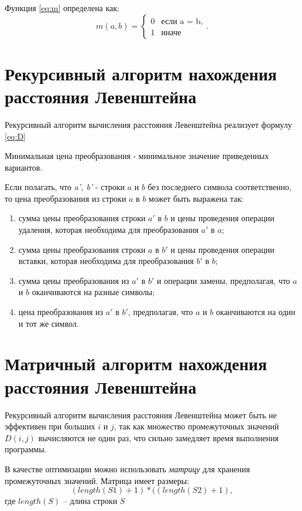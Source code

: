 Функция \ref{eq:m} определена как:
\begin{equation}
	\label{eq:m}
	m(a, b) = \begin{cases}
		0 &\text{если a = b,}\\
		1 &\text{иначе}
	\end{cases}.
\end{equation}


\section{Рекурсивный алгоритм нахождения расстояния Левенштейна}
Рекурсивный алгоритм вычисления расстояния Левенштейна реализует формулу \ref{eq:D}

Минимальная цена преобразования - минимальное значение приведенных вариантов.

Если полагать, что \textit{a', b'} - строки $a$ и $b$ без последнего символа соответственно, то цена преобразования из строки $a$ в $b$ может быть выражена так:

\begin{enumerate}
	\item сумма цены преобразования строки $a'$ в $b$ и цены проведения операции удаления, которая необходима для преобразования $a'$ в $a$;
	\item сумма цены преобразования строки $a$ в $b'$  и цены проведения операции вставки, которая необходима для преобразования $b'$ в $b$;
	\item сумма цены преобразования из $a'$ в $b'$ и операции замены, предполагая, что $a$ и $b$ оканчиваются на разные символы;
	\item цена преобразования из $a'$ в $b'$, предполагая, что $a$ и $b$ оканчиваются на один и тот же символ.
\end{enumerate}


\section{Матричный алгоритм нахождения расстояния Левенштейна}

Рекурсивный алгоритм вычисления расстояния Левенштейна может быть не эффективен при больших $i$ и $j$, так как множество промежуточных значений $D(i, j)$ вычисляются не один раз, что сильно замедляет время выполнения программы.

В качестве оптимизации можно использовать \textit{матрицу} для хранения промежуточных значений. Матрица имеет размеры:
\begin{equation}
	(length(S1)+ 1)*((length(S2) + 1),
\end{equation}
где $length(S)$ -- длина строки $S$

